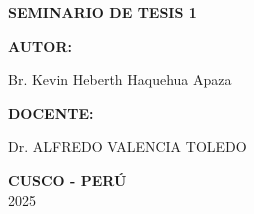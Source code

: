 \begin{center}
\fontsize{14pt}{11pt}\selectfont\bfseries{SEMINARIO DE TESIS 1} 
\end{center}


\hspace{8cm} \textbf{AUTOR:} \nolinebreak
\vspace{-0.3cm}

\hspace{8cm} Br. Kevin Heberth Haquehua Apaza


\hspace{8cm} \textbf{DOCENTE:} \nolinebreak
\vspace{-0.3cm}

\hspace{8cm} Dr. ALFREDO VALENCIA TOLEDO
\vspace{-0.3cm}





\vspace{0.3cm}						

\begin{center}
\Large \textbf{CUSCO - PERÚ} \\  2025
\end{center}

\clearpage